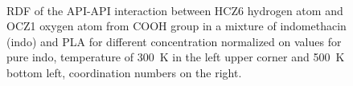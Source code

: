 \begin{figure}[htb!]
	\centering
	\\
	\vspace{-0.3cm}
	\caption{RDF of the API-API interaction between HCZ6 hydrogen atom and OCZ1 oxygen atom from COOH group in a mixture of indomethacin (indo) and PLA for different concentration normalized on values for pure indo, temperature of 300~K in the left upper corner and 500~K bottom left, coordination numbers on the right.}
	\label{fig:indo_RDF_}
\end{figure}


